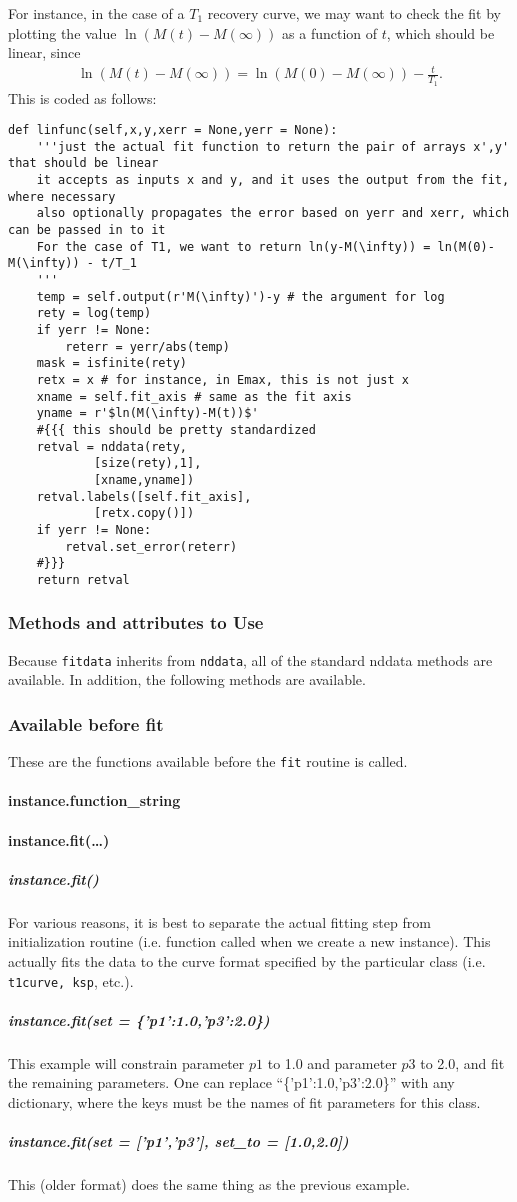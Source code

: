For instance, in the case of a $T_1$ recovery curve,
    we may want to check the fit by
    plotting the value $\ln(M(t)-M(\infty))$
    as a function of $t$, which should be linear,
    since
    \begin{align}
        \ln(M(t)-M(\infty)) = \ln(M(0)-M(\infty)) - \frac{t}{T_1}
        .
    \end{align}
This is coded as follows:
\begin{lstlisting}
def linfunc(self,x,y,xerr = None,yerr = None):
    '''just the actual fit function to return the pair of arrays x',y' that should be linear
    it accepts as inputs x and y, and it uses the output from the fit, where necessary
    also optionally propagates the error based on yerr and xerr, which can be passed in to it
    For the case of T1, we want to return ln(y-M(\infty)) = ln(M(0)-M(\infty)) - t/T_1
    '''
    temp = self.output(r'M(\infty)')-y # the argument for log
    rety = log(temp)
    if yerr != None:
        reterr = yerr/abs(temp)
    mask = isfinite(rety)
    retx = x # for instance, in Emax, this is not just x
    xname = self.fit_axis # same as the fit axis
    yname = r'$ln(M(\infty)-M(t))$'
    #{{{ this should be pretty standardized
    retval = nddata(rety,
            [size(rety),1],
            [xname,yname])
    retval.labels([self.fit_axis],
            [retx.copy()])
    if yerr != None:
        retval.set_error(reterr)
    #}}}
    return retval
\end{lstlisting}
\subsubsection{Methods and attributes to Use}
Because {\tt fitdata} inherits from {\tt nddata},
    all of the standard nddata methods are available.
In addition, the following methods are available.
\subsubsection{Available before fit}
These are the functions available before the {\tt fit}
    routine is called.
\paragraph{instance.function\_string}
\paragraph{instance.fit(\ldots)}
\subparagraph{instance.fit()}
For various reasons, it is best to separate
    the actual fitting step from initialization
    routine (i.e. function called when we create
    a new instance).
This actually fits the data to the curve format
    specified by the particular class (i.e. {\tt t1curve, ksp}, etc.).
\subparagraph{instance.fit(set = \{'p1':1.0,'p3':2.0\})}
This example will constrain parameter $p1$ to 1.0 and parameter $p3$ to 2.0,
    and fit the remaining parameters.
One can replace ``\{'p1':1.0,'p3':2.0\}''
    with any dictionary, where the keys must be the names
    of fit parameters for this class.
\subparagraph{instance.fit(set = ['p1','p3'], set\_to = [1.0,2.0])}
This (older format) does the same thing as the previous example.
